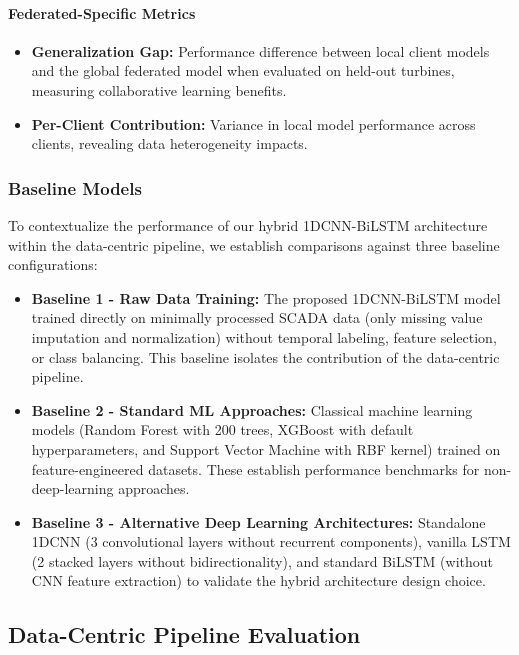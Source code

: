 \documentclass[12pt]{article}
\begin{document}
\paragraph{Federated-Specific Metrics}
\begin{itemize}
    \item \textbf{Generalization Gap:} Performance difference between local client models and the global federated model when evaluated on held-out turbines, measuring collaborative learning benefits.
    \item \textbf{Per-Client Contribution:} Variance in local model performance across clients, revealing data heterogeneity impacts.
\end{itemize}

\subsubsection{Baseline Models}

To contextualize the performance of our hybrid 1DCNN-BiLSTM architecture within the data-centric pipeline, we establish comparisons against three baseline configurations:

\begin{itemize}
    \item \textbf{Baseline 1 - Raw Data Training:} The proposed 1DCNN-BiLSTM model trained directly on minimally processed SCADA data (only missing value imputation and normalization) without temporal labeling, feature selection, or class balancing. This baseline isolates the contribution of the data-centric pipeline.
    
    \item \textbf{Baseline 2 - Standard ML Approaches:} Classical machine learning models (Random Forest with 200 trees, XGBoost with default hyperparameters, and Support Vector Machine with RBF kernel) trained on feature-engineered datasets. These establish performance benchmarks for non-deep-learning approaches.
    
    \item \textbf{Baseline 3 - Alternative Deep Learning Architectures:} Standalone 1DCNN (3 convolutional layers without recurrent components), vanilla LSTM (2 stacked layers without bidirectionality), and standard BiLSTM (without CNN feature extraction) to validate the hybrid architecture design choice.
\end{itemize}

\subsection{Data-Centric Pipeline Evaluation}
\end{document}
